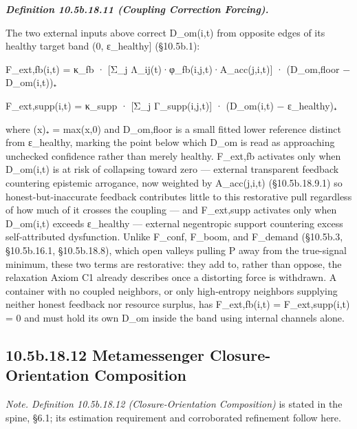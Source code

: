 \documentclass[
]{article}
\begin{document}
\emph{\textbf{Definition 10.5b.18.11 (Coupling Correction Forcing).}}

The two external inputs above correct D\_om(i,t) from opposite edges of
its healthy target band (0, ε\_healthy{]} (§10.5b.1):

F\_ext,fb(i,t) = κ\_fb · {[}Σ\_j Λ\_ij(t)·φ\_fb(i,j,t)·A\_acc(j,i,t){]}
· (D\_om,floor − D\_om(i,t))₊

F\_ext,supp(i,t) = κ\_supp · {[}Σ\_j Γ\_supp(i,j,t){]} · (D\_om(i,t) −
ε\_healthy)₊

where (x)₊ = max(x,0) and D\_om,floor is a small fitted lower reference
distinct from ε\_healthy, marking the point below which D\_om is read as
approaching unchecked confidence rather than merely healthy. F\_ext,fb
activates only when D\_om(i,t) is at risk of collapsing toward zero ---
external transparent feedback countering epistemic arrogance, now
weighted by A\_acc(j,i,t) (§10.5b.18.9.1) so honest-but-inaccurate
feedback contributes little to this restorative pull regardless of how
much of it crosses the coupling --- and F\_ext,supp activates only when
D\_om(i,t) exceeds ε\_healthy --- external negentropic support
countering excess self-attributed dysfunction. Unlike F\_conf, F\_boom,
and F\_demand (§10.5b.3, §10.5b.16.1, §10.5b.18.8), which open valleys
pulling P away from the true-signal minimum, these two terms are
restorative: they add to, rather than oppose, the relaxation Axiom C1
already describes once a distorting force is withdrawn. A container with
no coupled neighbors, or only high-entropy neighbors supplying neither
honest feedback nor resource surplus, has F\_ext,fb(i,t) =
F\_ext,supp(i,t) = 0 and must hold its own D\_om inside the band using
internal channels alone.

\hypertarget{b.18.12-metamessenger-closure-orientation-composition}{%
\subsection{10.5b.18.12 Metamessenger Closure-Orientation
Composition}\label{b.18.12-metamessenger-closure-orientation-composition}}

\emph{Note. Definition 10.5b.18.12 (Closure-Orientation Composition)} is
stated in the spine, §6.1; its estimation requirement and corroborated
refinement follow here.
\end{document}
